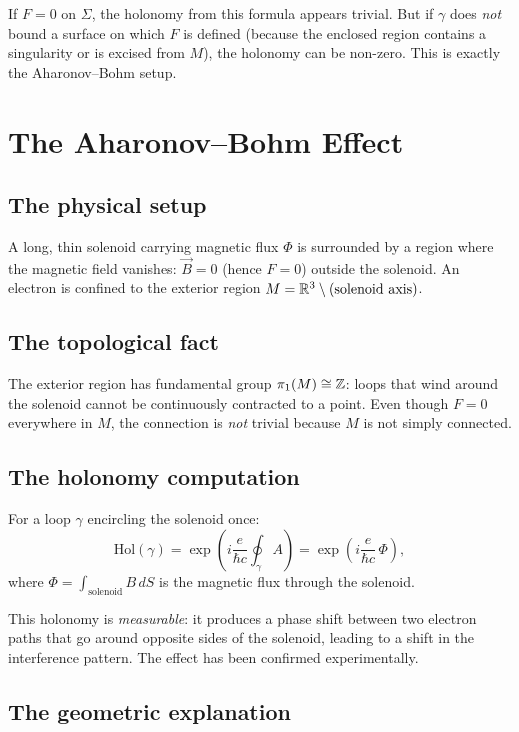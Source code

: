 If $F = 0$ on $\Sigma$, the holonomy from this formula appears trivial. But if $\gamma$ does \emph{not} bound a surface on which $F$ is defined (because the enclosed region contains a singularity or is excised from $M$), the holonomy can be non-zero. This is exactly the Aharonov--Bohm setup.

\section{The Aharonov--Bohm Effect}

\subsection{The physical setup}

A long, thin solenoid carrying magnetic flux $\Phi$ is surrounded by a region where the magnetic field vanishes: $\vec{B} = 0$ (hence $F = 0$) outside the solenoid. An electron is confined to the exterior region $M = \mathbb{R}^3 \setminus (\text{solenoid axis})$.

\subsection{The topological fact}

The exterior region has fundamental group $\pi_1(M) \cong \mathbb{Z}$: loops that wind around the solenoid cannot be continuously contracted to a point. Even though $F = 0$ everywhere in $M$, the connection is \emph{not} trivial because $M$ is not simply connected.

\subsection{The holonomy computation}

For a loop $\gamma$ encircling the solenoid once:
\begin{equation}
\mathrm{Hol}(\gamma) = \exp\!\left(i\frac{e}{\hbar c}\oint_\gamma A\right) = \exp\!\left(i\frac{e}{\hbar c}\,\Phi\right),
\end{equation}
where $\Phi = \int_{\text{solenoid}} B\,dS$ is the magnetic flux through the solenoid.

This holonomy is \emph{measurable}: it produces a phase shift between two electron paths that go around opposite sides of the solenoid, leading to a shift in the interference pattern. The effect has been confirmed experimentally.

\subsection{The geometric explanation}

